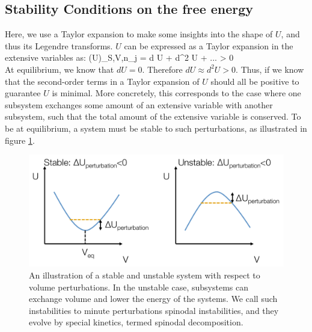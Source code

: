 \documentclass[12pt]{article}
\begin{document}
\subsection{Stability Conditions on the free energy} 
Here, we use a Taylor expansion to make some insights into the shape of $U$, and thus its Legendre transforms. $U$ can be expressed as a Taylor expansion in the extensive variables as:
\eqs
(\Delta U)_{S,V,n_j} = d U + d^2 U + ... > 0\\
\eqe
At equilibrium, we know that $d U = 0$. Therefore $dU \approx d^2U > 0$.  Thus, if we know that the second-order terms in a Taylor expansion of $U$ should all be positive to guarantee $U$ is minimal. More concretely, this corresponds to the case where one subsystem exchanges some amount of an extensive variable with another subsystem, such that the total amount of the extensive variable is conserved. To be at equilibrium, a system must be stable to such perturbations, as illustrated in figure \ref{stability}. 
\begin{figure}[h]
\centering
\includegraphics[width=\textwidth]{StabilityWRTPerturbations}
\caption{An illustration of a stable and unstable system with respect to volume perturbations. In the unstable case, subsystems can exchange volume and lower the energy of the systems. We call such instabilities to minute perturbations spinodal instabilities, and they evolve by special kinetics, termed spinodal decomposition.}
\label{stability}
\end{figure}
\end{document}
